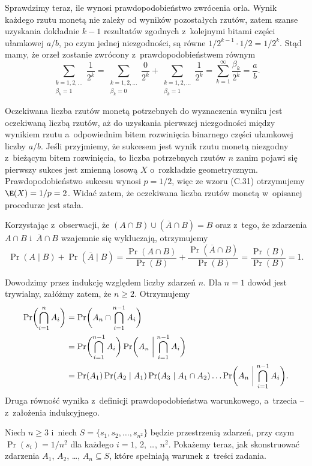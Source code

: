Sprawdzimy teraz, ile wynosi prawdopodobieństwo zwrócenia orła.
Wynik każdego rzutu monetą nie zależy od wyników pozostałych rzutów, zatem szanse uzyskania dokładnie $k-1$ rezultatów zgodnych z~kolejnymi bitami części ułamkowej $a/b$, po czym jednej niezgodności, są równe $1/2^{k-1}\cdot1/2=1/2^k$.
Stąd mamy, że orzeł zostanie zwrócony z~prawdopodobieństwem równym
\[
    \sum_{\substack{k=1,2,\dots\\\beta_k=1}}\!\frac{1}{2^k} = \sum_{\substack{k=1,2,\dots\\\beta_k=0}}\!\frac{0}{2^k}+\sum_{\substack{k=1,2,\dots\\\beta_k=1}}\!\frac{1}{2^k} = \sum_{k=1}^\infty\frac{\beta_k}{2^k} = \frac{a}{b}.
\]

Oczekiwana liczba rzutów monetą potrzebnych do wyznaczenia wyniku jest oczekiwaną liczbą rzutów, aż do uzyskania pierwszej niezgodności między wynikiem rzutu a~odpowiednim bitem rozwinięcia binarnego części ułamkowej liczby $a/b$.
Jeśli przyjmiemy, że sukcesem jest wynik rzutu monetą niezgodny z~bieżącym bitem rozwinięcia, to liczba potrzebnych rzutów $n$ zanim pojawi się pierwszy sukces jest zmienną losową $X$ o~rozkładzie geometrycznym.
Prawdopodobieństwo sukcesu wynosi $p=1/2$, więc ze wzoru (C.31) otrzymujemy $\E(X)=1/p=2$.
Widać zatem, że oczekiwana liczba rzutów monetą w~opisanej procedurze jest stała.

\exercise %
Korzystając z~obserwacji, że $(A\cap B)\cup(\overline{A}\cap B)=B$ oraz z~tego, że zdarzenia $A\cap B$ i~$\overline{A}\cap B$ wzajemnie się wykluczają, otrzymujemy
\[
	\Pr(A\mid B)+\Pr(\overline{A}\mid B) = \frac{\Pr(A\cap B)}{\Pr(B)}+\frac{\Pr(\overline{A}\cap B)}{\Pr(B)} = \frac{\Pr(B)}{\Pr(B)} = 1.
\]

\exercise %
Dowodzimy przez indukcję względem liczby zdarzeń $n$.
Dla $n=1$ dowód jest trywialny, załóżmy zatem, że $n\ge2$.
Otrzymujemy
\begin{align*}
	\Pr\biggl(\bigcap_{i=1}^nA_i\biggr) &= \Pr\biggl(A_n\cap\bigcap_{i=1}^{n-1}A_i\biggr) \\
	&= \Pr\biggl(\bigcap_{i=1}^{n-1}A_i\biggr)\Pr\biggl(A_n\biggm|\bigcap_{i=1}^{n-1}A_i\biggr) \\
	&= \Pr(A_1)\Pr(A_2\mid A_1)\Pr(A_3\mid A_1\cap A_2)\dots\Pr\biggl(A_n\biggm|\bigcap_{i=1}^{n-1}A_i\biggr).
\end{align*}
Druga równość wynika z~definicji prawdopodobieństwa warunkowego, a~trzecia -- z~założenia indukcyjnego.

\exercise %
Niech $n\ge3$ i~niech $S=\{s_1,s_2,\dots,s_{n^2}\}$ będzie przestrzenią zdarzeń, przy czym $\Pr(s_i)=1/n^2$ dla każdego $i=1$, 2, \dots, $n^2$.
Pokażemy teraz, jak skonstruować zdarzenia $A_1$, $A_2$, \dots, $A_n\subseteq S$, które spełniają warunek z~treści zadania.


